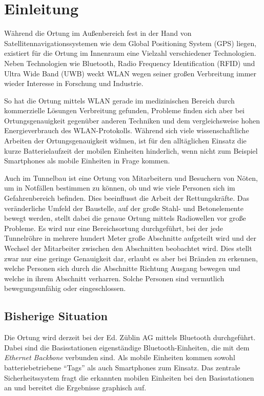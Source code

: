 \chapter{Einleitung}
\label{ch:Einleitung}
Während die Ortung im Außenbereich fest in der Hand von Satellitennavigationssystemen wie dem Global Positioning System (GPS) liegen, existiert für die Ortung im Innenraum eine Vielzahl verschiedener Technologien. Neben Technologien wie Bluetooth, Radio Frequency Identification (RFID) und Ultra Wide Band (UWB) weckt WLAN wegen seiner großen Verbreitung immer wieder Interesse in Forschung und Industrie.

So hat die Ortung mittels WLAN gerade im medizinischen Bereich durch kommerzielle Lösungen Verbreitung gefunden, Probleme finden sich aber bei Ortungsgenauigkeit gegenüber anderen Techniken und dem vergleichsweise hohen Energieverbrauch des WLAN-Protokolls.
Während sich viele wissenschaftliche Arbeiten der Ortungsgenauigkeit widmen, ist für den alltäglichen Einsatz die kurze Batterielaufzeit der mobilen Einheiten hinderlich, wenn nicht zum Beispiel Smartphones als mobile Einheiten in Frage kommen.

Auch im Tunnelbau ist eine Ortung von Mitarbeitern und Besuchern von Nöten, um in Notfällen bestimmen zu können, ob und wie viele Personen sich im Gefahrenbereich befinden.
Dies beeinflusst die Arbeit der Rettungskräfte.
Das veränderliche Umfeld der Baustelle, auf der große Stahl- und Betonelemente bewegt werden, stellt dabei die genaue Ortung mittels Radiowellen vor große Probleme.
Es wird nur eine Bereichsortung durchgeführt, bei der jede Tunnelröhre in mehrere hundert Meter große Abschnitte aufgeteilt wird und der Wechsel der Mitarbeiter zwischen den Abschnitten beobachtet wird.
Dies stellt zwar nur eine geringe Genauigkeit dar, erlaubt es aber bei Bränden zu erkennen, welche Personen sich durch die Abschnitte Richtung Ausgang bewegen und welche in ihrem Abschnitt verharren.
Solche Personen sind vermutlich bewegungsunfähig oder eingeschlossen.


\section{Bisherige Situation}
Die Ortung wird derzeit bei der Ed. Züblin AG mittels Bluetooth durchgeführt.
Dabei sind die Basisstationen eigenständige Bluetooth-Einheiten, die mit dem \emph{Ethernet Backbone} verbunden sind.
Als mobile Einheiten kommen sowohl batteriebetriebene "`Tags"' als auch Smartphones zum Einsatz.
Das zentrale Sicherheitssystem fragt die erkannten mobilen Einheiten bei den Basisstationen an und bereitet die Ergebnisse graphisch auf.

